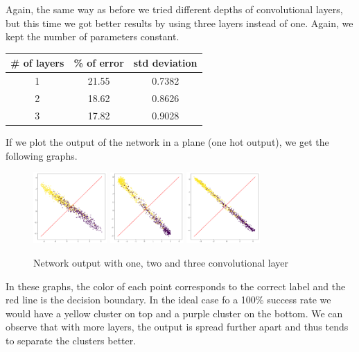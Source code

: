 \documentclass{article}
\begin{document}
Again, the same way as before we tried different depths of convolutional layers, but this time we got better results by using three layers instead of one. Again, we kept the number of parameters constant.

\begin{center}
\begin{tabular}{|c|c|c|}
\hline 
\# of layers & \% of error & std deviation \\ 
\hline 
1 & 21.55 & 0.7382 \\ 
\hline 
2 & 18.62 & 0.8626 \\ 
\hline 
3 & 17.82 & 0.9028 \\ 
\hline 
\end{tabular}
\end{center} 

If we plot the output of the network in a plane (one hot output), we get the following graphs.

\begin{figure}[H]
\begin{center}
\includegraphics[width=0.25\textwidth]{ws_conv1}
\includegraphics[width=0.25\textwidth]{ws_conv2}
\includegraphics[width=0.25\textwidth]{ws_conv3}
\caption{Network output with one, two and three convolutional layer}
\end{center}
\end{figure}

In these graphs, the color of each point corresponds to the correct label and the red line is the decision boundary. In the ideal case fo a 100\% success rate we would have a yellow cluster on top and a purple cluster on the bottom. We can observe that with more layers, the output is spread further apart and thus tends to separate the clusters better.
\end{document}
